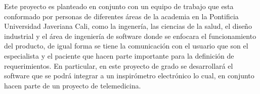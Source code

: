 

Este proyecto es planteado en conjunto con un equipo de trabajo que esta conformado por personas de diferentes \'areas de la academia en la Pontificia Universidad Javeriana Cali, como la ingener\'ia, las ciencias de la salud, el dise\~{n}o industrial y el \'area de ingenier\'ia de software donde se enfocara el funcionamiento del producto, de igual forma se tiene la comunicaci\'on con el usuario que son el especialista y el paciente que hacen parte importante para la definici\'on de requerimientos. En particular, en este proyecto de grado se desarrollar\'a el software que se podr\'a integrar a un inspir\'ometro electr\'onico lo cual, en conjunto hacen parte de un proyecto de telemedicina. 

